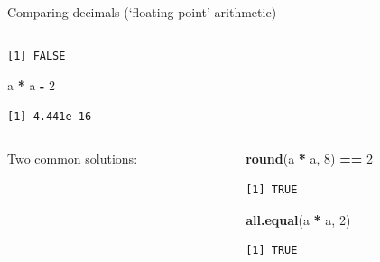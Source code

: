 \documentclass[
  11pt,
  ignorenonframetext,
]{beamer}
\newcommand{\VERB}{\Verb[commandchars=\\\{\}]}
\newenvironment{Shaded}{\begin{snugshade}}{\end{snugshade}}
\newcommand{\DecValTok}[1]{\textcolor[rgb]{0.00,0.00,0.81}{#1}}
\newcommand{\FunctionTok}[1]{\textcolor[rgb]{0.13,0.29,0.53}{\textbf{#1}}}
\newcommand{\NormalTok}[1]{#1}
\newcommand{\SpecialCharTok}[1]{\textcolor[rgb]{0.81,0.36,0.00}{\textbf{#1}}}
\providecommand{\tightlist}{%
  \setlength{\itemsep}{0pt}\setlength{\parskip}{0pt}}
\begin{document}
\begin{frame}[fragile]{Comparing decimals (`floating point' arithmetic)}
\begin{columns}[T,onlytextwidth]
\begin{column}{0.48\textwidth}
\begin{verbatim}
[1] FALSE
\end{verbatim}

\begin{Shaded}
\begin{Highlighting}[]
\NormalTok{a }\SpecialCharTok{*}\NormalTok{ a }\SpecialCharTok{{-}} \DecValTok{2}
\end{Highlighting}
\end{Shaded}

\begin{verbatim}
[1] 4.441e-16
\end{verbatim}
\end{column}
\end{columns}

\begin{columns}[T,onlytextwidth]
\begin{column}{0.48\textwidth}
Two common solutions:

\end{column}

\begin{column}{0.48\textwidth}
\begin{Shaded}
\begin{Highlighting}[]
\FunctionTok{round}\NormalTok{(a }\SpecialCharTok{*}\NormalTok{ a, }\DecValTok{8}\NormalTok{) }\SpecialCharTok{==} \DecValTok{2}
\end{Highlighting}
\end{Shaded}

\begin{verbatim}
[1] TRUE
\end{verbatim}

\begin{Shaded}
\begin{Highlighting}[]
\FunctionTok{all.equal}\NormalTok{(a }\SpecialCharTok{*}\NormalTok{ a, }\DecValTok{2}\NormalTok{)}
\end{Highlighting}
\end{Shaded}

\begin{verbatim}
[1] TRUE
\end{verbatim}
\end{column}
\end{columns}
\end{frame}
\end{document}
